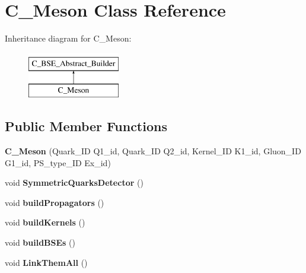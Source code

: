 \hypertarget{class_c___meson}{\section{C\-\_\-\-Meson Class Reference}
\label{class_c___meson}
}
Inheritance diagram for C\-\_\-\-Meson\-:\begin{figure}[H]
\begin{center}
\leavevmode
\includegraphics[height=2.000000cm]{class_c___meson}
\end{center}
\end{figure}
\subsection*{Public Member Functions}
\begin{DoxyCompactItemize}
\item 
\hypertarget{class_c___meson_a420efdd72187874a8430d616266833f1}{{\bfseries C\-\_\-\-Meson} (Quark\-\_\-\-I\-D Q1\-\_\-id, Quark\-\_\-\-I\-D Q2\-\_\-id, Kernel\-\_\-\-I\-D K1\-\_\-id, Gluon\-\_\-\-I\-D G1\-\_\-id, P\-S\-\_\-type\-\_\-\-I\-D Ex\-\_\-id)}\label{class_c___meson_a420efdd72187874a8430d616266833f1}

\item 
\hypertarget{class_c___meson_ae21f82fc9162ccc59e38a9eeda1ec51e}{void {\bfseries Symmetric\-Quarks\-Detector} ()}\label{class_c___meson_ae21f82fc9162ccc59e38a9eeda1ec51e}

\item 
\hypertarget{class_c___meson_a7c7a699f66d424cf9903931bba0ee87b}{void {\bfseries build\-Propagators} ()}\label{class_c___meson_a7c7a699f66d424cf9903931bba0ee87b}

\item 
\hypertarget{class_c___meson_ad998f092a112975437273ed65470126e}{void {\bfseries build\-Kernels} ()}\label{class_c___meson_ad998f092a112975437273ed65470126e}

\item 
\hypertarget{class_c___meson_a0fc41cd31216390951ccab66779d47e6}{void {\bfseries build\-B\-S\-Es} ()}\label{class_c___meson_a0fc41cd31216390951ccab66779d47e6}

\item 
\hypertarget{class_c___meson_ad0a7c652dbd7078285002b1153e99bb6}{void {\bfseries Link\-Them\-All} ()}\label{class_c___meson_ad0a7c652dbd7078285002b1153e99bb6}

\end{DoxyCompactItemize}
